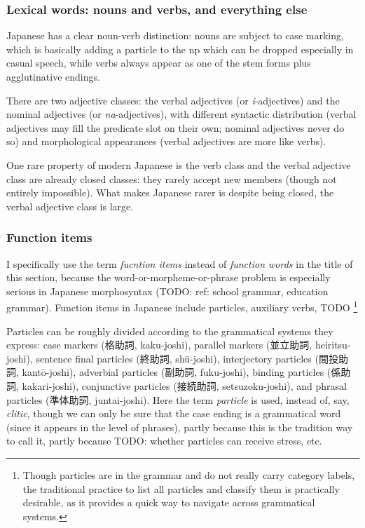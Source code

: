 \documentclass[UTF8, a4paper, oneside, scheme=plain]{ctexart}
\newcommand*{\term}[1]{\emph{#1}}
\newcommand{\corpus}[1]{\emph{#1}}
\begin{document}
\subsubsection{Lexical words: nouns and verbs, and everything else}

Japanese has a clear noun-verb distinction:
nouns are subject to case marking,
which is basically adding a particle to the \acs{np} 
which can be dropped especially in casual speech,
while verbs always appear as one of the stem forms plus agglutinative endings.

There are two adjective classes:
the verbal adjectives (or \corpus{i}-adjectives)
and the nominal adjectives (or \corpus{na}-adjectives),
with different syntactic distribution 
(verbal adjectives may fill the predicate slot on their own; nominal adjectives never do so)
and morphological appearances
(verbal adjectives are more like verbs).

One rare property of modern Japanese is the verb class and the verbal adjective class 
are already closed classes:
they rarely accept new members (though not entirely impossible).
What makes Japanese rarer is despite being closed,
the verbal adjective class is large.

\subsubsection{Function items}

I specifically use the term \term{fucntion items} instead of \term{function words}
in the title of this section,
because the word-or-morpheme-or-phrase problem is especially serious in Japanese morphosyntax
(TODO: ref: school grammar, education grammar).
Function items in Japanese include particles, auxiliary verbs, TODO %
\footnote{
    Though particles are in the grammar and do not really carry category labels,
    the traditional practice to list all particles and classify them 
    is practically desirable, 
    as it provides a quick way to navigate across grammatical systems.
}

Particles can be roughly divided according to the grammatical systems they express:
case markers (格助詞, kaku-joshi),
parallel markers (並立助詞, heiritsu-joshi),
sentence final particles (終助詞, shū-joshi),
interjectory particles (間投助詞, kantō-joshi),
adverbial particles (副助詞, fuku-joshi),
binding particles (係助詞, kakari-joshi),
conjunctive particles (接続助詞, setsuzoku-joshi),
and phrasal particles (準体助詞, juntai-joshi).
Here the term \term{particle} is used,
instead of, say, \term{clitic},
though we can only be sure that the case ending is a grammatical word 
(since it appears in the level of phrases),
partly because this is the tradition way to call it,
partly because TODO: whether particles can receive stress, etc.
\end{document}
